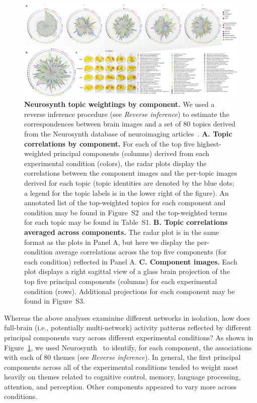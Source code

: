 \documentclass[english, 11pt]{article}
\newcommand{\topTerms}{S2}
\newcommand{\componentBrains}{S3}
\newcommand{\topics}{S1}
\begin{document}
\begin{figure}
  \centering
  \includegraphics[width=\textwidth]{figs/neurosynth_by_component}

\caption{\textbf{Neurosynth topic weightings by component.} We used a reverse
inference procedure (see \textit{Reverse inference}) to estimate the
correspondences between brain images and a set of 80 topics derived from the
Neurosynth database of neuroimaging articles~\citep{RubiEtal17}. \textbf{A.
Topic correlations by component.} For each of the top five highest-weighted
principal components (columns) derived from each experimental condition
(colors), the radar plots display the correlations between the component images
and the per-topic images derived for each topic (topic identities are denoted
by the blue dots; a legend for the topic labels is in the lower right of the
figure). An annotated list of the top-weighted topics for each component and
condition may be found in Figure~\topTerms~and the top-weighted terms for each
topic may be found in Table~\topics. \textbf{B. Topic correlations averaged
across components.} The radar plot is in the same format as the plots in Panel
A, but here we display the per-condition average correlations across the top
five components (for each condition) reflected in Panel A. \textbf{C. Component
images.} Each plot displays a right sagittal view of a glass brain projection of
the top five principal components (columns) for each experimental condition
(rows). Additional projections for each component may be found in
Figure~\componentBrains.}

\label{fig:neurosynth-pca}

\end{figure}

Whereas the above analyses examinine different networks in isolation, how does
full-brain (i.e., potentially multi-network) activity patterns reflected by
different principal components vary across different experimental conditions?
As shown in Figure~\ref{fig:neurosynth-pca}, we used
Neurosynth~\citep{RubiEtal17} to identify, for each component, the associations
with each of 80 themes (see \textit{Reverse inference}). In general, the first
principal components across all of the experimental conditions tended to weight
most heavily on themes related to cognitive control, memory, language
processing, attention, and perception. Other components appeared to vary more
across conditions.
\end{document}
